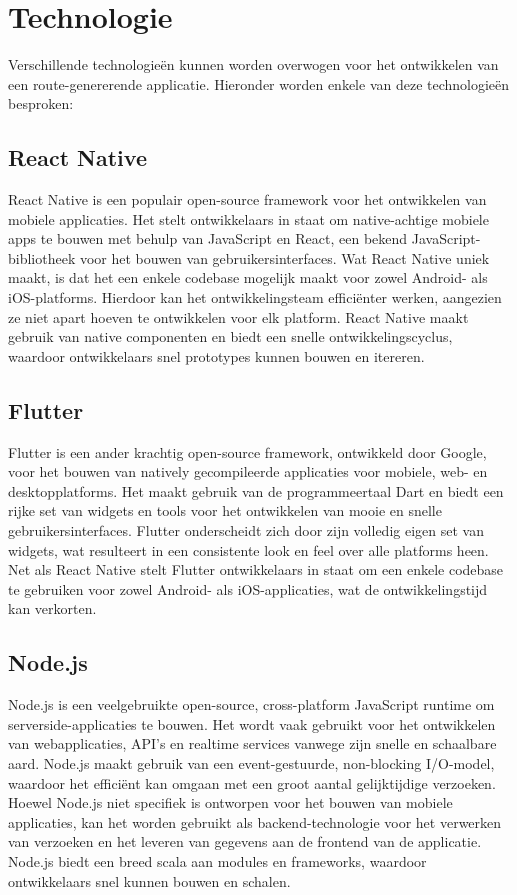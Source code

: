     \section{Technologie}


    Verschillende technologieën kunnen worden overwogen voor het ontwikkelen van een route-genererende applicatie. Hieronder worden enkele van deze technologieën besproken:

    \subsection{React Native}

    React Native is een populair open-source framework voor het ontwikkelen van mobiele applicaties. 
    Het stelt ontwikkelaars in staat om native-achtige mobiele apps te bouwen met behulp van JavaScript en React, een bekend JavaScript-bibliotheek voor het bouwen van gebruikersinterfaces. 
    Wat React Native uniek maakt, is dat het een enkele codebase mogelijk maakt voor zowel Android- als iOS-platforms. Hierdoor kan het ontwikkelingsteam efficiënter werken, 
    aangezien ze niet apart hoeven te ontwikkelen voor elk platform. React Native maakt gebruik van native componenten en biedt een snelle ontwikkelingscyclus, 
    waardoor ontwikkelaars snel prototypes kunnen bouwen en itereren.

    \subsection{Flutter}
    
    Flutter is een ander krachtig open-source framework, ontwikkeld door Google, voor het bouwen van natively gecompileerde applicaties voor mobiele, web- en desktopplatforms. 
    Het maakt gebruik van de programmeertaal Dart en biedt een rijke set van widgets en tools voor het ontwikkelen van mooie en snelle gebruikersinterfaces. 
    Flutter onderscheidt zich door zijn volledig eigen set van widgets, wat resulteert in een consistente look en feel over alle platforms heen. 
    Net als React Native stelt Flutter ontwikkelaars in staat om een enkele codebase te gebruiken voor zowel Android- als iOS-applicaties, wat de ontwikkelingstijd kan verkorten.

    \subsection{Node.js}
    
    Node.js is een veelgebruikte open-source, cross-platform JavaScript runtime om serverside-applicaties te bouwen. 
    Het wordt vaak gebruikt voor het ontwikkelen van webapplicaties, API's en realtime services vanwege zijn snelle en schaalbare aard. Node.js maakt gebruik van een event-gestuurde, 
    non-blocking I/O-model, waardoor het efficiënt kan omgaan met een groot aantal gelijktijdige verzoeken. Hoewel Node.js niet specifiek is ontworpen voor het bouwen van mobiele applicaties, 
    kan het worden gebruikt als backend-technologie voor het verwerken van verzoeken en het leveren van gegevens aan de frontend van de applicatie. Node.js biedt een breed scala aan modules en frameworks, 
    waardoor ontwikkelaars snel kunnen bouwen en schalen.


